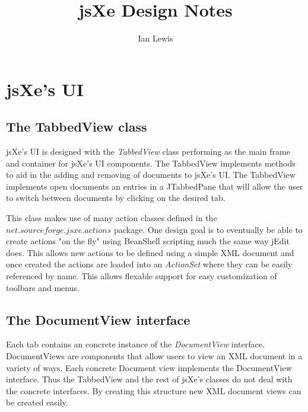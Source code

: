 \documentclass[12pt]{article}
\begin{document}
\title{jsXe Design Notes}
\author{Ian Lewis}
\maketitle

\section{jsXe's UI}

\subsection{The TabbedView class}
jsXe's UI is designed with the \emph{TabbedView} class performing as the main
frame and container for jsXe's UI components. The TabbedView implements methods
to aid in the adding and removing of documents to jsXe's UI. The TabbedView
implements open documents an entries in a JTabbedPane that will allow the user
to switch between documents by clicking on the desired tab.

This class makes use of many action classes defined in the\\
$net.sourceforge.jsxe.actions$ package. One design goal is to eventually be able
to create actions "on the fly" using BeanShell scripting much the same way 
jEdit does. This allows new actions to be defined using a simple XML document
and once created the actions are loaded into an \emph{ActionSet} where they
can be easily referenced by name. This allows flexable support for easy
customization of toolbars and menus.

\subsection{The DocumentView interface}
Each tab contains an concrete instance of the \emph{DocumentView} interface.
DocumentViews are components that allow users to view an XML document in a
variety of ways. Each concrete Document view implements the DocumentView
interface. Thus the TabbedView and the rest of jsXe's classes do not deal with
the concrete interfaces. By creating this structure new XML document views can
be created easily.
\end{document}
